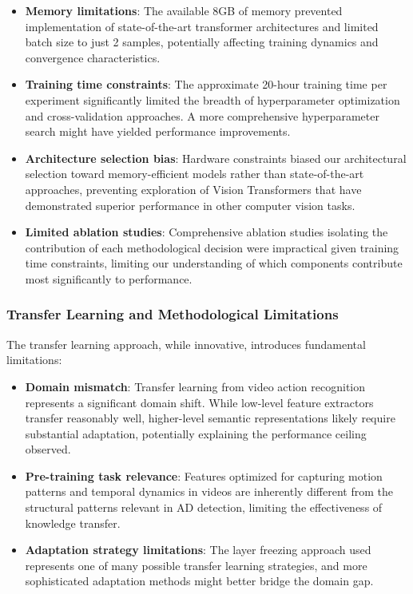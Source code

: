 \documentclass[12pt, a4paper]{article}
\begin{document}
\begin{itemize}
    \item \textbf{Memory limitations}: The available 8GB of memory prevented implementation of state-of-the-art transformer architectures and limited batch size to just 2 samples, potentially affecting training dynamics and convergence characteristics.
    
    \item \textbf{Training time constraints}: The approximate 20-hour training time per experiment significantly limited the breadth of hyperparameter optimization and cross-validation approaches. A more comprehensive hyperparameter search might have yielded performance improvements.
    
    \item \textbf{Architecture selection bias}: Hardware constraints biased our architectural selection toward memory-efficient models rather than state-of-the-art approaches, preventing exploration of Vision Transformers that have demonstrated superior performance in other computer vision tasks.
    
    \item \textbf{Limited ablation studies}: Comprehensive ablation studies isolating the contribution of each methodological decision were impractical given training time constraints, limiting our understanding of which components contribute most significantly to performance.
\end{itemize}

\subsubsection{Transfer Learning and Methodological Limitations}

The transfer learning approach, while innovative, introduces fundamental limitations:

\begin{itemize}
    \item \textbf{Domain mismatch}: Transfer learning from video action recognition represents a significant domain shift. While low-level feature extractors transfer reasonably well, higher-level semantic representations likely require substantial adaptation, potentially explaining the performance ceiling observed.
    
    \item \textbf{Pre-training task relevance}: Features optimized for capturing motion patterns and temporal dynamics in videos are inherently different from the structural patterns relevant in AD detection, limiting the effectiveness of knowledge transfer.
    
    \item \textbf{Adaptation strategy limitations}: The layer freezing approach used represents one of many possible transfer learning strategies, and more sophisticated adaptation methods might better bridge the domain gap.
\end{itemize}
\end{document}
